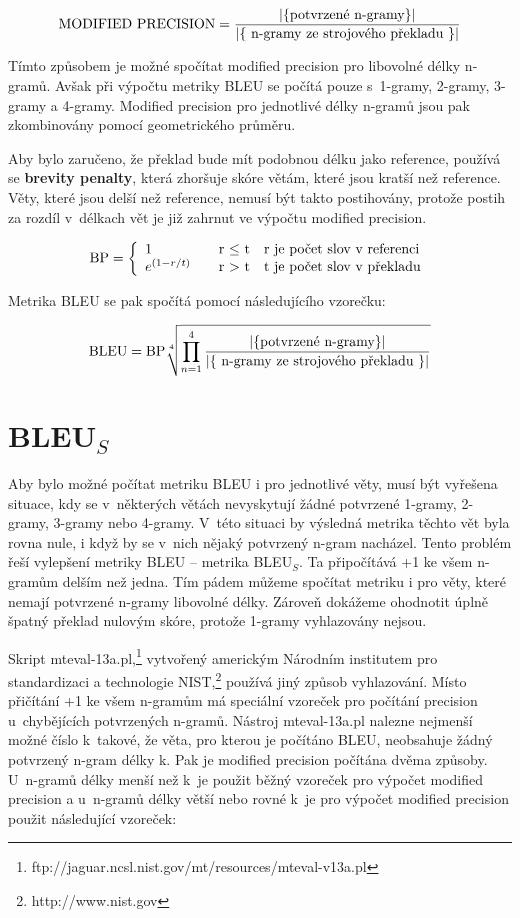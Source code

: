 $$ \text{MODIFIED PRECISION} = \frac{\lvert \lbrace \text{potvrzené \mbox{n-gramy}} \rbrace \rvert }{ \lvert \lbrace \text{ \mbox{n-gramy} ze strojového překladu } \rbrace \rvert } $$

Tímto způsobem je možné spočítat modified precision pro libovolné délky \mbox{n-gramů}.
Avšak při výpočtu metriky BLEU se počítá pouze s~\mbox{1-gramy}, \mbox{2-gramy}, \mbox{3-gramy} a \mbox{4-gramy}.
Modified precision pro jednotlivé délky \mbox{n-gramů} jsou pak zkombinovány pomocí geometrického průměru.

Aby bylo zaručeno,
  že překlad bude mít podobnou délku jako reference,
  používá se \textbf{brevity penalty},
  která zhoršuje skóre větám, které jsou kratší než reference.
Věty, které jsou delší než reference,
  nemusí být takto postihovány,
  protože postih za rozdíl v~délkach vět je již zahrnut ve výpočtu modified precision.

$$
\text{BP} = \left\{
	\begin{array}{l l l}
		1 & \quad \text{r $\leq$ t} & \text{r je počet slov v~referenci} \\
		e^{(1-r/t)} & \quad \text{r $>$ t} & \text{t je počet slov v~překladu}
	\end{array}
\right.
$$


Metrika BLEU se pak spočítá pomocí následujícího vzorečku:

$$ \text{BLEU} = \text{BP} \sqrt[4]{\prod_{n=1}^{4} \frac{\lvert \lbrace \text{potvrzené \mbox{n-gramy}} \rbrace \rvert }{ \lvert \lbrace \text{ \mbox{n-gramy} ze strojového překladu } \rbrace \rvert }} $$


\section{BLEU${}_S$}
Aby bylo možné počítat metriku BLEU i pro jednotlivé věty,
  musí být vyřešena situace,
  kdy se v~některých větách nevyskytují žádné potvrzené \mbox{1-gramy}, \mbox{2-gramy}, \mbox{3-gramy} nebo \mbox{4-gramy}.
V~této situaci by výsledná metrika těchto vět byla rovna nule,
  i když by se v~nich nějaký potvrzený \mbox{n-gram} nacházel.
Tento problém řeší vylepšení metriky BLEU -- metrika BLEU${}_S$. %
Ta připočítává +1 ke všem \mbox{n-gramům} delším než jedna.
Tím pádem můžeme spočítat metriku i pro věty,
  které nemají potvrzené \mbox{n-gramy} libovolné délky.
Zároveň dokážeme ohodnotit úplně špatný překlad nulovým skóre,
  protože \mbox{1-gramy} vyhlazovány nejsou.

Skript mteval-13a.pl,\footnote{ftp://jaguar.ncsl.nist.gov/mt/resources/mteval-v13a.pl}
  vytvořený americkým Národním institutem pro standardizaci a technologie NIST,\footnote{http://www.nist.gov}
  používá jiný způsob vyhlazování.
Místo přičítání +1 ke všem \mbox{n-gramům} má speciální vzoreček pro počítání precision u~chybějících potvrzených \mbox{n-gramů}.
Nástroj mteval-13a.pl nalezne nejmenší možné číslo k~takové,
  že věta, pro kterou je počítáno BLEU,
  neobsahuje žádný potvrzený \mbox{n-gram} délky k.
Pak je modified precision počítána dvěma způsoby.
U~\mbox{n-gramů} délky menší než k~je použit běžný vzoreček pro výpočet modified precision a
  u~\mbox{n-gramů} délky větší nebo rovné k~je pro výpočet modified precision použit následující vzoreček:

